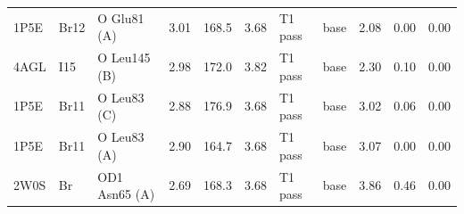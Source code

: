 \begin{table}[!htbp]
\begin{tabular}{lllrrrllrrr}
1P5E & Br12 & O Glu81 (A) & 3.01 & 168.5 & 3.68 & T1 pass & base & 2.08 & 0.00 & 0.00\\
4AGL & I15 & O Leu145 (B) & 2.98 & 172.0 & 3.82 & T1 pass & base & 2.30 & 0.10 & 0.00\\
1P5E & Br11 & O Leu83 (C) & 2.88 & 176.9 & 3.68 & T1 pass & base & 3.02 & 0.06 & 0.00\\
1P5E & Br11 & O Leu83 (A) & 2.90 & 164.7 & 3.68 & T1 pass & base & 3.07 & 0.00 & 0.00\\
2W0S & Br & OD1 Asn65 (A) & 2.69 & 168.3 & 3.68 & T1 pass & base & 3.86 & 0.46 & 0.00\\
\bottomrule\end{tabular}\end{table}
